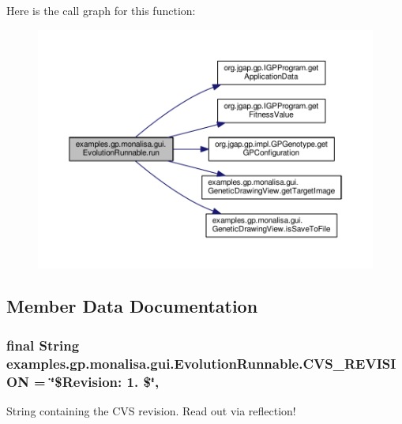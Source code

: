 Here is the call graph for this function\-:
\nopagebreak
\begin{figure}[H]
\begin{center}
\leavevmode
\includegraphics[width=350pt]{classexamples_1_1gp_1_1monalisa_1_1gui_1_1_evolution_runnable_a9d3096aba73fd2550d5d723848d2eb74_cgraph}
\end{center}
\end{figure}




\subsection{Member Data Documentation}
\hypertarget{classexamples_1_1gp_1_1monalisa_1_1gui_1_1_evolution_runnable_a26443b314e22a06c369d6efeae3f5f3c}{
\subsubsection[{C\-V\-S\-\_\-\-R\-E\-V\-I\-S\-I\-O\-N}]{\setlength{\rightskip}{0pt plus 5cm}final String examples.\-gp.\-monalisa.\-gui.\-Evolution\-Runnable.\-C\-V\-S\-\_\-\-R\-E\-V\-I\-S\-I\-O\-N = \char`\"{}\$Revision\-: 1. \$\char`\"{}\hspace{0.3cm}{\ttfamily [static]}, {\ttfamily [private]}}}\label{classexamples_1_1gp_1_1monalisa_1_1gui_1_1_evolution_runnable_a26443b314e22a06c369d6efeae3f5f3c}
String containing the C\-V\-S revision. Read out via reflection! 

